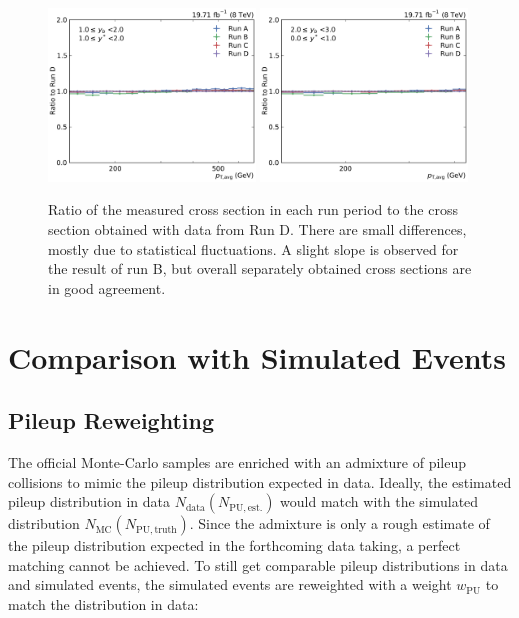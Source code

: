\begin{figure}[htbp]
    \includegraphics[width=0.49\textwidth]{figures/measurement/run_comparison_yb1ys1.pdf}\hfill
    \includegraphics[width=0.49\textwidth]{figures/measurement/run_comparison_yb2ys0.pdf}
    \caption[Stability of result over all run periods]{Ratio of the measured
    cross section in each run period to the cross section obtained with data
    from Run D. There are small differences, mostly due to statistical fluctuations.
    A slight slope is observed for the result of run B, but overall separately
    obtained cross sections are in good agreement.}
    \label{fig:run_comparison}
\end{figure}

\section{Comparison with Simulated Events}
\label{sec:simulated_events}

\subsection{Pileup Reweighting}

The official Monte-Carlo samples are enriched with an admixture of pileup
collisions to mimic the pileup distribution expected in data. Ideally, the
estimated pileup distribution in data $N_\mathrm{data} (N_\mathrm{PU, est.})$
would match with the simulated distribution $N_\mathrm{MC} (N_\mathrm{PU,
truth})$. Since the admixture is only a rough estimate of the pileup
distribution expected in the forthcoming data taking, a perfect matching cannot
be achieved. To still get comparable pileup distributions in data and simulated
events, the simulated events are reweighted with a weight $w_\mathrm{PU}$ to
match the distribution in data: 

